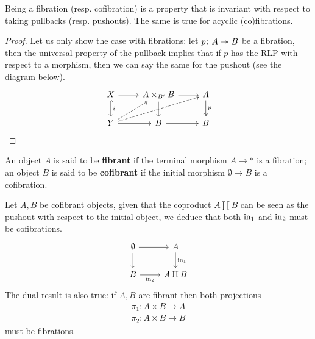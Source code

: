 \begin{corollary}
	\label{cor:closed-push-pull}
	Being a fibration (resp. cofibration) is a property that is invariant with respect to taking pullbacks (resp. pushouts). The same is true for acyclic (co)fibrations.
\end{corollary}
\begin{proof}
	Let us only show the case with fibrations: let $p\colon A \twoheadrightarrow B$ be a fibration, then the universal property of the pullback implies that if $p$ has the RLP with respect to a morphism, then we can say the same for the pushout (see the diagram below).
	\[\begin{tikzcd}
		X & {A\times_{B'}B} & A \\
		Y & B & B
		\arrow[from=1-1, to=1-2]
		\arrow["i", hook, from=1-1, to=2-1]
		\arrow[from=1-2, to=1-3]
		\arrow[from=1-2, to=2-2]
		\arrow["p", two heads, from=1-3, to=2-3]
		\arrow[dashed, from=2-1, to=1-2]
		\arrow[dashed, from=2-1, to=1-3]
		\arrow[from=2-1, to=2-2]
		\arrow[from=2-2, to=2-3]
	\end{tikzcd}\]
\end{proof}

\begin{definition}
	An object $A$ is said to be \textbf{fibrant} if the terminal morphism $A \longrightarrow *$ is a fibration; an object $B$ is said to be \textbf{cofibrant} if the initial morphism $\emptyset \longrightarrow B$ is a cofibration.
\end{definition}

\begin{remark}
	Let $A,B$ be cofibrant objects, given that the coproduct $A \amalg B$ can be seen as the pushout with respect to the initial object, we deduce that both $\mathrm{in}_1$ and $\mathrm{in}_2$ must be cofibrations.
	\[\begin{tikzcd}
		\emptyset & A \\
		B & {A\amalg B}
		\arrow[from=1-1, to=1-2]
		\arrow[from=1-1, to=2-1]
		\arrow["{\inn_1}", from=1-2, to=2-2]
		\arrow["{\inn_2}"', from=2-1, to=2-2]
	\end{tikzcd}\]
	The dual result is also true: if $A,B$ are fibrant then both projections
	\begin{align*}
		\pi_1\colon A\times B \longrightarrow A\\
		\pi_2\colon A \times B \longrightarrow B
	\end{align*}
	must be fibrations.
\end{remark}


